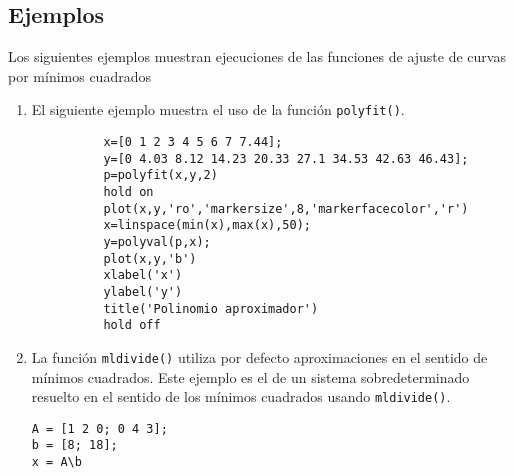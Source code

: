\documentclass[12pt,letterpaper]{article}
\begin{document}
\subsection{Ejemplos}
                                                                                                                                                                  
Los siguientes ejemplos muestran ejecuciones de las funciones de ajuste de curvas por m\'inimos cuadrados

\begin{enumerate}
	
    \item El siguiente ejemplo muestra el uso de la funci\'on \texttt{polyfit()}.
    \begin{verbatim}
          x=[0 1 2 3 4 5 6 7 7.44];
          y=[0 4.03 8.12 14.23 20.33 27.1 34.53 42.63 46.43];
          p=polyfit(x,y,2)
          hold on
          plot(x,y,'ro','markersize',8,'markerfacecolor','r')
          x=linspace(min(x),max(x),50);
          y=polyval(p,x);
          plot(x,y,'b')
          xlabel('x')
          ylabel('y')
          title('Polinomio aproximador')
          hold off
    \end{verbatim}
    
    \item La funci\'on \texttt{mldivide()} utiliza por defecto aproximaciones en el sentido de m\'inimos cuadrados. Este ejemplo es el de un sistema sobredeterminado resuelto en el sentido de los m\'inimos cuadrados usando \texttt{mldivide()}.
    \begin{verbatim}
A = [1 2 0; 0 4 3];
b = [8; 18];
x = A\b
    \end{verbatim}
    
\end{enumerate}
\end{document}
